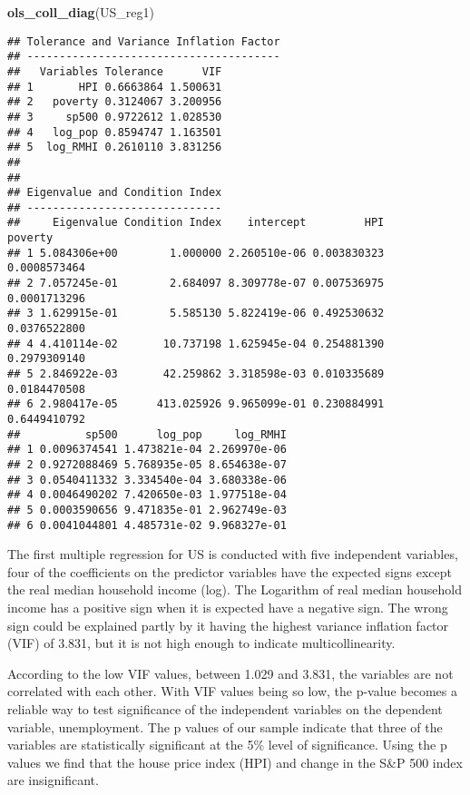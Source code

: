\documentclass[
]{article}
\newenvironment{Shaded}{\begin{snugshade}}{\end{snugshade}}
\newcommand{\KeywordTok}[1]{\textcolor[rgb]{0.13,0.29,0.53}{\textbf{#1}}}
\newcommand{\NormalTok}[1]{#1}
\begin{document}
\begin{Shaded}
\begin{Highlighting}[]
\KeywordTok{ols_coll_diag}\NormalTok{(US_reg1)}
\end{Highlighting}
\end{Shaded}

\begin{verbatim}
## Tolerance and Variance Inflation Factor
## ---------------------------------------
##   Variables Tolerance      VIF
## 1       HPI 0.6663864 1.500631
## 2   poverty 0.3124067 3.200956
## 3     sp500 0.9722612 1.028530
## 4   log_pop 0.8594747 1.163501
## 5  log_RMHI 0.2610110 3.831256
## 
## 
## Eigenvalue and Condition Index
## ------------------------------
##     Eigenvalue Condition Index    intercept         HPI      poverty
## 1 5.084306e+00        1.000000 2.260510e-06 0.003830323 0.0008573464
## 2 7.057245e-01        2.684097 8.309778e-07 0.007536975 0.0001713296
## 3 1.629915e-01        5.585130 5.822419e-06 0.492530632 0.0376522800
## 4 4.410114e-02       10.737198 1.625945e-04 0.254881390 0.2979309140
## 5 2.846922e-03       42.259862 3.318598e-03 0.010335689 0.0184470508
## 6 2.980417e-05      413.025926 9.965099e-01 0.230884991 0.6449410792
##          sp500      log_pop     log_RMHI
## 1 0.0096374541 1.473821e-04 2.269970e-06
## 2 0.9272088469 5.768935e-05 8.654638e-07
## 3 0.0540411332 3.334540e-04 3.680338e-06
## 4 0.0046490202 7.420650e-03 1.977518e-04
## 5 0.0003590656 9.471835e-01 2.962749e-03
## 6 0.0041044801 4.485731e-02 9.968327e-01
\end{verbatim}

The first multiple regression for US is conducted with five independent
variables, four of the coefficients on the predictor variables have the
expected signs except the real median household income (log). The
Logarithm of real median household income has a positive sign when it is
expected have a negative sign. The wrong sign could be explained partly
by it having the highest variance inflation factor (VIF) of 3.831, but
it is not high enough to indicate multicollinearity.

According to the low VIF values, between 1.029 and 3.831, the variables
are not correlated with each other. With VIF values being so low, the
p-value becomes a reliable way to test significance of the independent
variables on the dependent variable, unemployment. The p values of our
sample indicate that three of the variables are statistically
significant at the 5\% level of significance. Using the p values we find
that the house price index (HPI) and change in the S\&P 500 index are
insignificant.
\end{document}
